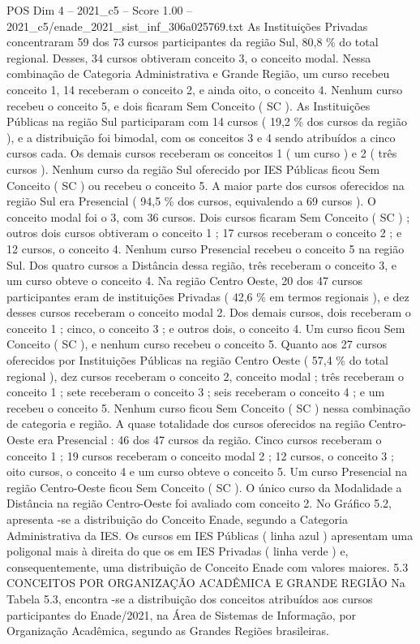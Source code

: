 \begin{textsample}{POS Dim 4 – 2021\_c5 – Score 1.00 – 2021\_c5/enade\_2021\_sist\_inf\_306a025769.txt}
As Instituições Privadas concentraram 59 dos 73 cursos participantes da região Sul, 80,8 \% do total regional.
Desses, 34 cursos obtiveram conceito 3, o conceito modal.
Nessa combinação de Categoria Administrativa e Grande Região, um curso recebeu conceito 1, 14 receberam o conceito 2, e ainda oito, o conceito 4.
Nenhum curso recebeu o conceito 5, e dois ficaram Sem Conceito ( SC ).
As Instituições Públicas na região Sul participaram com 14 cursos ( 19,2 \% dos cursos da região ), e a distribuição foi bimodal, com os conceitos 3 e 4 sendo atribuídos a cinco cursos cada.
Os demais cursos receberam os conceitos 1 ( um curso ) e 2 ( três cursos ).
Nenhum curso da região Sul oferecido por IES Públicas ficou Sem Conceito ( SC ) ou recebeu o conceito 5.
A maior parte dos cursos oferecidos na região Sul era Presencial ( 94,5 \% dos cursos, equivalendo a 69 cursos ).
O conceito modal foi o 3, com 36 cursos.
Dois cursos ficaram Sem Conceito ( SC ) ; outros dois cursos obtiveram o conceito 1 ; 17 cursos receberam o conceito 2 ; e 12 cursos, o conceito 4.
Nenhum curso Presencial recebeu o conceito 5 na região Sul.
Dos quatro cursos a Distância dessa região, três receberam o conceito 3, e um curso obteve o conceito 4.
Na região Centro Oeste, 20 dos 47 cursos participantes eram de instituições Privadas ( 42,6 \% em termos regionais ), e dez desses cursos receberam o conceito modal 2.
Dos demais cursos, dois receberam o conceito 1 ; cinco, o conceito 3 ; e outros dois, o conceito 4.
Um curso ficou Sem Conceito ( SC ), e nenhum curso recebeu o conceito 5.
Quanto aos 27 cursos oferecidos por Instituições Públicas na região Centro Oeste ( 57,4 \% do total regional ), dez cursos receberam o conceito 2, conceito modal ; três receberam o conceito 1 ; sete receberam o conceito 3 ; seis receberam o conceito 4 ; e um recebeu o conceito 5.
Nenhum curso ficou Sem Conceito ( SC ) nessa combinação de categoria e região.
A quase totalidade dos cursos oferecidos na região Centro-Oeste era Presencial : 46 dos 47 cursos da região.
Cinco cursos receberam o conceito 1 ; 19 cursos receberam o conceito modal 2 ; 12 cursos, o conceito 3 ; oito cursos, o conceito 4 e um curso obteve o conceito 5.
Um curso Presencial na região Centro-Oeste ficou Sem Conceito ( SC ).
O único curso da Modalidade a Distância na região Centro-Oeste foi avaliado com conceito 2.
No Gráfico 5.2, apresenta -se a distribuição do Conceito Enade, segundo a Categoria Administrativa da IES.
Os cursos em IES Públicas ( linha azul ) apresentam uma poligonal mais à direita do que os em IES Privadas ( linha verde ) e, consequentemente, uma distribuição de Conceito Enade com valores maiores. 5.3 CONCEITOS POR ORGANIZAÇÃO ACADÊMICA E GRANDE REGIÃO Na Tabela 5.3, encontra -se a distribuição dos conceitos atribuídos aos cursos participantes do Enade/2021, na Área de Sistemas de Informação, por Organização Acadêmica, segundo as Grandes Regiões brasileiras.

\end{textsample}

